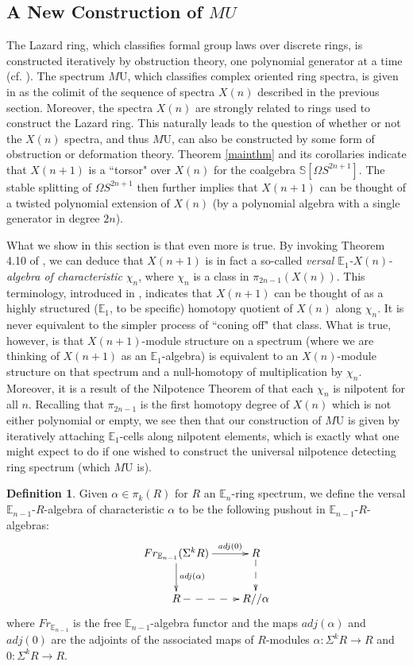 \documentclass{article}
\theoremstyle{definition}
\newtheorem{defi}[rem]{Definition}
\theoremstyle{plain}
\newcommand{\sph}{\mathbb{S}}
\newcommand{\E}{\mathbb{E}}
\newcommand{\MU}{M\mathrm{U}}
\begin{document}
\subsection{A New Construction of $MU$}\label{MUconst}
The Lazard ring, which classifies formal group laws over discrete rings, is constructed iteratively by obstruction theory, one polynomial generator at a time (cf. \cite{laz}). The spectrum $\MU$, which classifies complex oriented ring spectra, is given in \cite{rav} as the colimit of the sequence of spectra $X(n)$ described in the previous section. Moreover, the spectra $X(n)$ are strongly related to rings used to construct the Lazard ring. This naturally leads to the question of whether or not the $X(n)$ spectra, and thus $\MU$, can also be constructed by some form of obstruction or deformation theory. Theorem \ref{mainthm} and its corollaries indicate that $X(n+1)$ is a ``torsor" over $X(n)$ for the coalgebra $\sph[\Omega S^{2n+1}]$. The stable splitting of $\Omega S^{2n+1}$ then further implies that $X(n+1)$ can be thought of a twisted polynomial extension of $X(n)$ (by a polynomial algebra with a single generator in degree $2n$). 

What we show in this section is that even more is true. By invoking Theorem 4.10 of \cite{acb}, we can deduce that $X(n+1)$ is in fact a so-called \emph{versal $\E_1$-$X(n)$-algebra of characteristic $\chi_n$}, where $\chi_n$ is a class in $\pi_{2n-1}(X(n))$. This terminology, introduced in \cite{szymikprimechar}, indicates that $X(n+1)$ can be thought of as a highly structured ($\E_1$, to be specific) homotopy quotient of $X(n)$ along $\chi_n$. It is never equivalent to the simpler process of ``coning off" that class. What is true, however, is that $X(n+1)$-module structure on a spectrum (where we are thinking of $X(n+1)$ as an $\E_1$-algebra) is equivalent to an $X(n)$-module structure on that spectrum and a null-homotopy of multiplication by $\chi_n$. Moreover, it is a result of the Nilpotence Theorem of \cite{devhopsmith} that each $\chi_n$ is nilpotent for all $n$. Recalling that $\pi_{2n-1}$ is the first homotopy degree of $X(n)$ which is not either polynomial or empty, we see then that our construction of $\MU$ is given by iteratively attaching $\E_1$-cells along nilpotent elements, which is exactly what one might expect to do if one wished to construct the universal nilpotence detecting ring spectrum (which $\MU$ is). 

\begin{defi}
Given $\alpha\in\pi_k(R)$ for $R$ an $\E_n$-ring spectrum, we define the versal $\E_{n-1}$-$R$-algebra of characteristic $\alpha$ to be the following pushout in $\E_{n-1}$-$R$-algebras:
$$\xymatrix{
Fr_{\E_{n-1}}(\Sigma^{k}R)\ar[d]^{adj(\alpha)}\ar[r]^-{adj(0)} & R\ar@{-->}[d]\\
R\ar@{-->}[r] & R//\alpha
}$$
where $Fr_{\E_{n-1}}$ is the free $\E_{n-1}$-algebra functor and the maps $adj(\alpha)$ and $adj(0)$ are the adjoints of the associated maps of $R$-modules $\alpha \colon\Sigma^kR\to R$ and $0\colon\Sigma^k R\to R$.
\end{defi}
\end{document}

